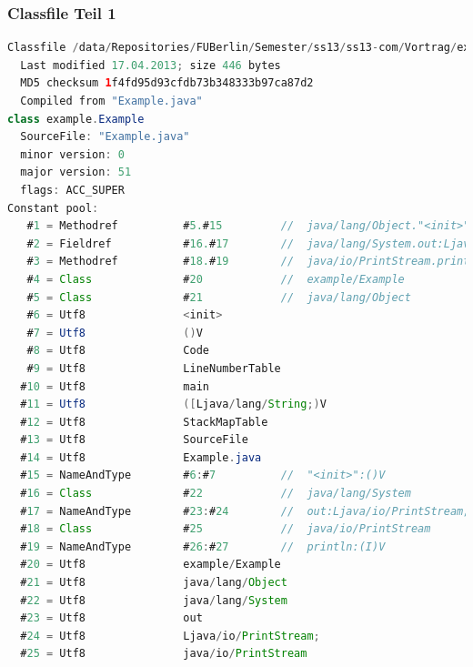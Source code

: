 \documentclass[10pt]{beamer}
\begin{document}
\begin{frame}[fragile]
\frametitle{Classfile Teil 1}
\begin{lstlisting}[language=Java,basicstyle=\ttfamily\tiny]
Classfile /data/Repositories/FUBerlin/Semester/ss13/ss13-com/Vortrag/example/Example.class
  Last modified 17.04.2013; size 446 bytes
  MD5 checksum 1f4fd95d93cfdb73b348333b97ca87d2
  Compiled from "Example.java"
class example.Example
  SourceFile: "Example.java"
  minor version: 0
  major version: 51
  flags: ACC_SUPER
Constant pool:
   #1 = Methodref          #5.#15         //  java/lang/Object."<init>":()V
   #2 = Fieldref           #16.#17        //  java/lang/System.out:Ljava/io/PrintStream;
   #3 = Methodref          #18.#19        //  java/io/PrintStream.println:(I)V
   #4 = Class              #20            //  example/Example
   #5 = Class              #21            //  java/lang/Object
   #6 = Utf8               <init>
   #7 = Utf8               ()V
   #8 = Utf8               Code
   #9 = Utf8               LineNumberTable
  #10 = Utf8               main
  #11 = Utf8               ([Ljava/lang/String;)V
  #12 = Utf8               StackMapTable
  #13 = Utf8               SourceFile
  #14 = Utf8               Example.java
  #15 = NameAndType        #6:#7          //  "<init>":()V
  #16 = Class              #22            //  java/lang/System
  #17 = NameAndType        #23:#24        //  out:Ljava/io/PrintStream;
  #18 = Class              #25            //  java/io/PrintStream
  #19 = NameAndType        #26:#27        //  println:(I)V
  #20 = Utf8               example/Example
  #21 = Utf8               java/lang/Object
  #22 = Utf8               java/lang/System
  #23 = Utf8               out
  #24 = Utf8               Ljava/io/PrintStream;
  #25 = Utf8               java/io/PrintStream
\end{lstlisting}
\end{frame}
\end{document}
